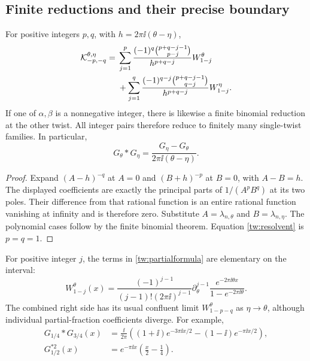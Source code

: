 \subsection{Finite reductions and their precise boundary}

\begin{proposition}
\label{tw:partial}
For positive integers $p,q$, with $h=2\pi\ii(\theta-\eta)$,
\begin{align}
 \mathcal K_{-p,-q}^{\theta,\eta}
 ={}&\sum_{j=1}^p
  \frac{(-1)^q\binom{p+q-j-1}{p-j}}{h^{p+q-j}}
                  W_{1-j}^\theta\notag\\
 &+\sum_{j=1}^q
  \frac{(-1)^{q-j}\binom{p+q-j-1}{q-j}}{h^{p+q-j}}
                  W_{1-j}^\eta.
 \label{tw:partialformula}
\end{align}
If one of $\alpha,\beta$ is a nonnegative integer, there is likewise
a finite binomial reduction at the other twist. All integer pairs
therefore reduce to finitely many single-twist families. In particular,
\begin{equation}
 G_\theta*G_\eta=\frac{G_\eta-G_\theta}{2\pi\ii(\theta-\eta)}.
 \label{tw:resolvent}
\end{equation}
\end{proposition}

\begin{proof}
Expand $(A-h)^{-q}$ at $A=0$ and $(B+h)^{-p}$ at $B=0$, with
$A-B=h$. The displayed coefficients are exactly the principal parts
of $1/(A^pB^q)$ at its two poles. Their difference from that rational
function is an entire rational function vanishing at infinity and is
therefore zero. Substitute $A=\lambda_{n,\theta}$ and
$B=\lambda_{n,\eta}$. The polynomial cases follow by the finite
binomial theorem. Equation \eqref{tw:resolvent} is $p=q=1$.
\end{proof}

For positive integer $j$, the terms in \eqref{tw:partialformula}
are elementary on the interval:
\begin{equation}
 W_{1-j}^\theta(x)
  =\frac{(-1)^{j-1}}{(j-1)!(2\pi\ii)^{j-1}}
      \partial_\theta^{j-1}
      \frac{e^{-2\pi\ii\theta x}}{1-e^{-2\pi\ii\theta}}.
 \label{tw:elementary}
\end{equation}
The combined right side has its usual confluent limit
$W_{1-p-q}^{\theta}$ as $\eta\to\theta$, although individual
partial-fraction coefficients diverge. For example,
\begin{align}
 G_{1/4}*G_{3/4}(x)
  &=\frac{\ii}{2\pi}
    \left((1+\ii)e^{-3\pi\ii x/2}
                   -(1-\ii)e^{-\pi\ii x/2}\right),\label{tw:quarters}\\
 G_{1/2}^{*2}(x)&=e^{-\pi\ii x}
                         \left(\frac{x}{2}-\frac14\right).
 \label{tw:half}
\end{align}

